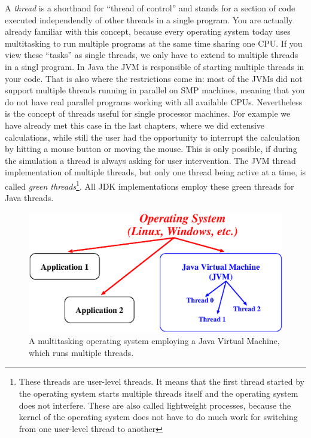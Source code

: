 A \emph{thread} is a shorthand for ``thread of control'' and stands for a
section of code executed independendly of other threads in a single program.
You are actually already familiar with this concept, because every operating
system today uses multitasking to run multiple programs at the same time sharing
one CPU. If you view these ``tasks'' as single threads, we only have to
extend to multiple threads in a singl program. In Java the JVM is responsible
of starting multiple threads in your code. That is also where the restrictions
come in: most of the JVMs did not support multiple threads running in
parallel on SMP machines, meaning that you do not have real parallel 
programs working with all available CPUs. Nevertheless is the concept
of threads useful for single processor machines. For example we have 
already met this case in the last chapters, where we did extensive
calculations, while still the user had the opportunity to interrupt the 
calculation by hitting a mouse button or moving the mouse. This is only
possible, if during the simulation a thread is always asking for user 
intervention. The JVM thread implementation of multiple threads, but only one thread
being active at a time, is called \emph{green threads}\footnote{These
threads are user-level threads. It means that the first thread started by the
operating system starts multiple threads itself and the operating system
does not interfere. These are also called lightweight processes, because
the kernel of the operating system does not have to do much work for
switching from one user-level thread to another}. All JDK 
implementations employ these green threads for Java threads.

\begin{figure}[htbp]
  \begin{center}
    \includegraphics[width=\textwidth]{Figures/Threads.eps}
    \caption{A multitasking operating system employing a Java Virtual Machine, which runs multiple threads.}
    \label{fig:Threads}
  \end{center}
\end{figure}

